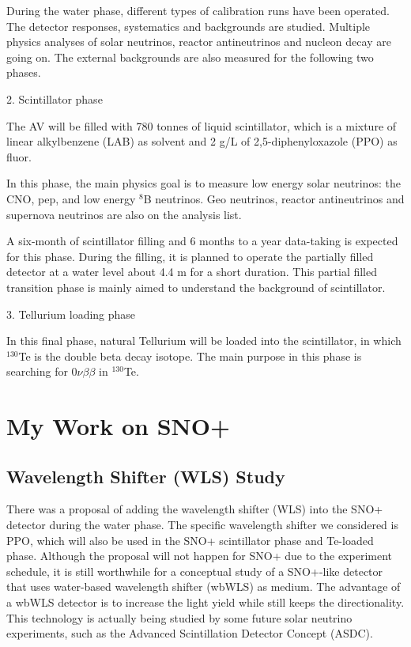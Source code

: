 \documentclass[preprint,12pt]{elsarticle}
\numberwithin{equation}{section}
\begin{document}
During the water phase, different types of calibration runs have been operated. The detector responses, systematics and backgrounds are studied. Multiple physics analyses of solar neutrinos, reactor antineutrinos and nucleon decay are going on. The external backgrounds are also measured for the following two phases. 

2. Scintillator phase

The AV will be filled with 780 tonnes of liquid scintillator, which is a mixture of linear alkylbenzene (LAB) as solvent and 2 g/L of 2,5-diphenyloxazole (PPO) as fluor.

In this phase, the main physics goal is to measure low energy solar neutrinos: the CNO, pep, and low energy $^8$B neutrinos. Geo neutrinos, reactor antineutrinos and supernova neutrinos are also on the analysis list.

A six-month of scintillator filling and 6 months to a year data-taking is expected for this phase. During the filling, it is planned to operate the partially filled detector at a water level about 4.4 m for a short duration. This partial filled transition phase is mainly aimed to understand the background of scintillator. 

3. Tellurium loading phase

In this final phase, natural Tellurium will be loaded into the scintillator, in which $^{130}$Te is the double beta decay isotope. The main purpose in this phase is searching for $0\nu\beta\beta$ in $^{130}$Te.

\section{My Work on SNO+}
\subsection{Wavelength Shifter (WLS) Study}
There was a proposal of adding the wavelength shifter (WLS) into the SNO+ detector during the water phase. The specific wavelength shifter we considered is PPO, which will also be used in the SNO+ scintillator phase and Te-loaded phase. Although the proposal will not happen for SNO+ due to the experiment schedule, it is still worthwhile for a conceptual study of a SNO+-like detector that uses water-based wavelength shifter (wbWLS) as medium. The advantage of a wbWLS detector is to increase the light yield while still keeps the directionality. This technology is actually being studied by some future solar neutrino experiments, such as the Advanced Scintillation Detector Concept (ASDC)\cite{asdc}.
\end{document}
